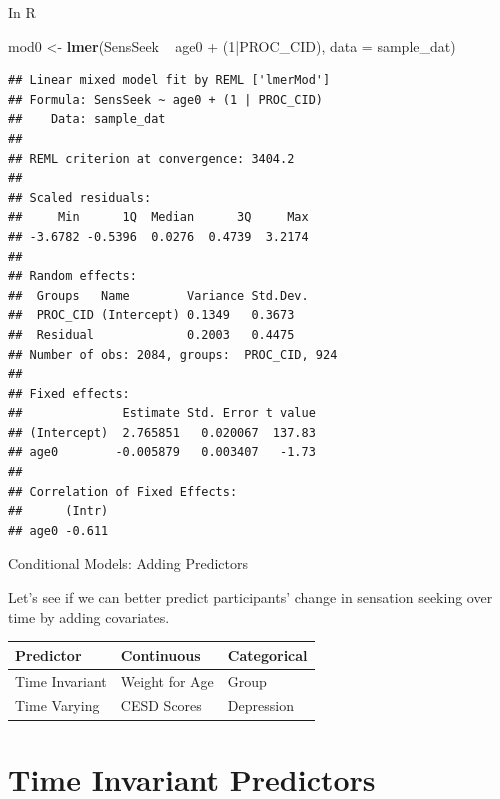 \documentclass[ignorenonframetext,]{beamer}
\newenvironment{Shaded}{\begin{snugshade}}{\end{snugshade}}
\newcommand{\KeywordTok}[1]{\textcolor[rgb]{0.13,0.29,0.53}{\textbf{{#1}}}}
\newcommand{\DataTypeTok}[1]{\textcolor[rgb]{0.13,0.29,0.53}{{#1}}}
\newcommand{\DecValTok}[1]{\textcolor[rgb]{0.00,0.00,0.81}{{#1}}}
\newcommand{\StringTok}[1]{\textcolor[rgb]{0.31,0.60,0.02}{{#1}}}
\newcommand{\NormalTok}[1]{{#1}}
\begin{document}
\begin{frame}[fragile]{In R}

\small

\begin{Shaded}
\begin{Highlighting}[]
\NormalTok{mod0 <-}\StringTok{ }\KeywordTok{lmer}\NormalTok{(SensSeek ~}\StringTok{ }\NormalTok{age0 +}\StringTok{ }\NormalTok{(}\DecValTok{1}\NormalTok{|PROC_CID), }\DataTypeTok{data =} \NormalTok{sample_dat)}
\end{Highlighting}
\end{Shaded}

\centering
\tiny

\begin{verbatim}
## Linear mixed model fit by REML ['lmerMod']
## Formula: SensSeek ~ age0 + (1 | PROC_CID)
##    Data: sample_dat
## 
## REML criterion at convergence: 3404.2
## 
## Scaled residuals: 
##     Min      1Q  Median      3Q     Max 
## -3.6782 -0.5396  0.0276  0.4739  3.2174 
## 
## Random effects:
##  Groups   Name        Variance Std.Dev.
##  PROC_CID (Intercept) 0.1349   0.3673  
##  Residual             0.2003   0.4475  
## Number of obs: 2084, groups:  PROC_CID, 924
## 
## Fixed effects:
##              Estimate Std. Error t value
## (Intercept)  2.765851   0.020067  137.83
## age0        -0.005879   0.003407   -1.73
## 
## Correlation of Fixed Effects:
##      (Intr)
## age0 -0.611
\end{verbatim}

\normalsize
\raggedleft

\end{frame}

\begin{frame}{Conditional Models: Adding Predictors}

Let's see if we can better predict participants' change in sensation
seeking over time by adding covariates.

\begin{longtable}[]{@{}lll@{}}
\toprule
Predictor & Continuous & Categorical\tabularnewline
\midrule
\endhead
Time Invariant & Weight for Age & Group\tabularnewline
Time Varying & CESD Scores & Depression\tabularnewline
\bottomrule
\end{longtable}

\end{frame}

\section{Time Invariant Predictors}\label{time-invariant-predictors}
\end{document}
